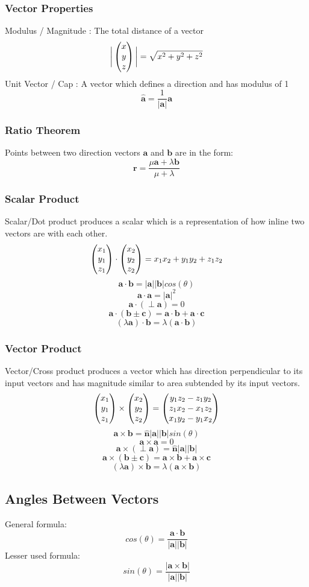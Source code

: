 \documentclass[../main]{subfiles}
\newcommand*\colvec[3][]{
    \begin{pmatrix}\ifx\relax#1\relax\else#1\\\fi#2\\#3\end{pmatrix}
}
\begin{document}
	\subsubsection{Vector Properties}
	Modulus / Magnitude : The total distance of a vector
	\[ \bigg|\colvec[x]{y}{z}\bigg| = \sqrt{x^2+y^2+z^2} \]
	Unit Vector / Cap : A vector which defines a direction and has modulus of 1
	\[ \mathbf{\hat{a}} = \frac{1}{|\mathbf{a}|}\mathbf{a} \]
	\subsubsection{Ratio Theorem}
	Points between two direction vectors \(\mathbf{a}\) and \(\mathbf{b}\) are in the form:
	\[ \mathbf{r} = \frac{\mu\mathbf{a} + \lambda\mathbf{b}}{\mu + \lambda} \]
	\subsubsection{Scalar Product}
	Scalar/Dot product produces a scalar which is a representation of how inline two vectors are with each other.
	\[ \colvec[x_1]{y_1}{z_1} \cdot \colvec[x_2]{y_2}{z_2} = x_1x_2 + y_1y_2 + z_1z_2 \]
	\[ \mathbf{a} \cdot \mathbf{b} = | \mathbf{a}| | \mathbf{b}| cos(\theta) \]
	\[ \mathbf{a} \cdot \mathbf{a} = | \mathbf{a}| ^2 \]
	\[ \mathbf{a} \cdot (\perp \mathbf{a}) = 0 \]
	\[ \mathbf{a} \cdot (\mathbf{b \pm c}) = \mathbf{a} \cdot \mathbf{b} + \mathbf{a} \cdot \mathbf{c} \]
	\[ (\lambda \mathbf{a}) \cdot \mathbf{b} = \lambda (\mathbf{a} \cdot \mathbf{b}) \]
	\subsubsection{Vector Product}
	Vector/Cross product produces a vector which has direction perpendicular to its input vectors and has magnitude similar to area subtended by its input vectors.
	\[ \colvec[x_1]{y_1}{z_1} \times \colvec[x_2]{y_2}{z_2} = \colvec[y_1z_2-z_1y_2]{z_1x_2-x_1z_2}{x_1y_2-y_1x_2} \]
	\[ \mathbf{a} \times \mathbf{b} = \mathbf{\hat{n}}| \mathbf{a}| | \mathbf{b}| sin(\theta) \]
	\[ \mathbf{a} \times \mathbf{a} = 0 \]
	\[ \mathbf{a} \times (\perp \mathbf{a}) = \mathbf{\hat{n}}| \mathbf{a}| | \mathbf{b}|  \]
	\[ \mathbf{a} \times (\mathbf{b \pm c}) = \mathbf{a} \times \mathbf{b} + \mathbf{a} \times \mathbf{c} \]
	\[ (\lambda \mathbf{a}) \times \mathbf{b} = \lambda (\mathbf{a} \times \mathbf{b}) \]

\subsection{Angles Between Vectors}
	General formula:
	\[ cos(\theta) = \frac{\mathbf{a} \cdot \mathbf{b}}{|\mathbf{a}||\mathbf{b}|} \]
	Lesser used formula:
	\[ sin(\theta) = \frac{|\mathbf{a} \times \mathbf{b}|}{|\mathbf{a}||\mathbf{b}|} \]
\end{document}
